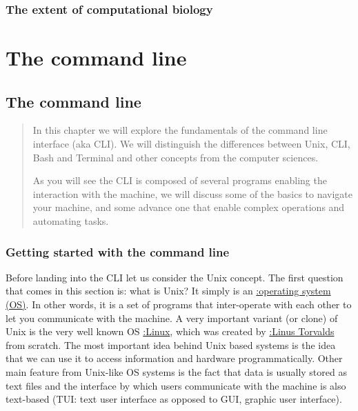 \documentclass[
  letterpaper,
  DIV=11,
  numbers=noendperiod,
  oneside]{scrreprt}
\begin{document}
\hypertarget{the-extent-of-computational-biology}{%
\section*{The extent of computational
biology}\label{the-extent-of-computational-biology}}

\part{The command line}

\hypertarget{sec-cli}{%
\chapter{The command line}\label{sec-cli}}

\begin{quote}
In this chapter we will explore the fundamentals of the command line
interface (aka CLI). We will distinguish the differences between Unix,
CLI, Bash and Terminal and other concepts from the computer sciences.

As you will see the CLI is composed of several programs enabling the
interaction with the machine, we will discuss some of the basics to
navigate your machine, and some advance one that enable complex
operations and automating tasks.
\end{quote}

\hypertarget{getting-started-with-the-command-line}{%
\section{Getting started with the command
line}\label{getting-started-with-the-command-line}}

Before landing into the CLI let us consider the Unix concept. The first
question that comes in this section is: what is Unix? It simply is an
\href{https://en.wikipedia.org/wiki/Operating_system}{:operating system
(OS)}. In other words, it is a set of programs that inter-operate with
each other to let you communicate with the machine. A very important
variant (or clone) of Unix is the very well known OS
\href{https://en.wikipedia.org/wiki/Linux}{:Linux}, which was created by
\href{https://en.wikipedia.org/wiki/Linus_Torvalds}{:Linus Torvalds}
from scratch. The most important idea behind Unix based systems is the
idea that we can use it to access information and hardware
programmatically. Other main feature from Unix-like OS systems is the
fact that data is usually stored as text files and the interface by
which users communicate with the machine is also text-based (TUI: text
user interface as opposed to GUI, graphic user interface).
\end{document}
